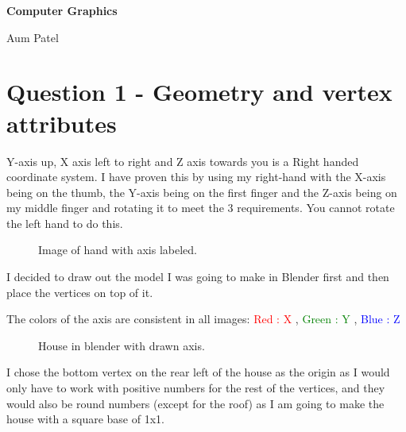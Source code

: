 \documentclass[10pt]{report}
\begin{document}
\begin{titlepage}
\center
{\huge\bfseries Computer Graphics 

Aum Patel
}

\end{titlepage}
\tableofcontents
\chapter{Question 1 - Geometry and vertex attributes}

Y-axis up, X axis left to right and Z axis towards you is a Right handed coordinate system. I have proven this by using my right-hand with the X-axis being on the thumb, the Y-axis being on the first finger and the Z-axis being on my middle finger and rotating it to meet the 3 requirements. You cannot rotate the left hand to do this.

\begin{figure}[h]
    \centering
    \caption{Image of hand with axis labeled.}
\end{figure}

I decided to draw out the model I was going to make in Blender first and then place the vertices on top of it. 

The colors of the axis are consistent in all images: \textcolor{red}{Red : X} , \textcolor{green}{Green : Y} , \textcolor{blue}{Blue : Z}

\begin{figure}[h]
    \centering
    \caption{House in blender with drawn axis.}
\end{figure}

I chose the bottom vertex on the rear left of the house as the origin as I would only have to work with positive numbers for the rest of the vertices, and they would also be round numbers (except for the roof) as I am going to make the house with a square base of 1x1. 
\end{document}
